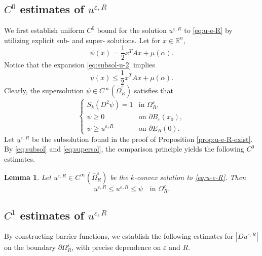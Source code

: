 \documentclass[reqno]{amsart}
\newtheorem{lemma}[theorem]{Lemma}
\theoremstyle{remark}
\theoremstyle{definition}
\numberwithin{equation}{section}
\begin{document}
\subsection{$C^0$ estimates of $u^{\varepsilon,R}$}\label{subsec:C0-est}
We first establish uniform $C^0$ bound for the solution $u^{\varepsilon,R}$ to \eqref{eq:u-e-R} by utilizing explicit sub- and super- solutions. 
Let for $x\in\mathbb{R}^n$,
\begin{equation}\label{eq:psi}
	\psi(x)=\frac{1}{2}x^TAx+\mu(\alpha).
\end{equation}
Notice that the expansion \eqref{eq:subsol-u-2} implies
$$\underline{u}(x)\leq\frac{1}{2}x^TAx+\mu(\alpha).$$
Clearly, the supersolution $\psi\in C^\infty(\bar{\Omega}_R^\varepsilon)$ satisfies that
\begin{equation}\label{eq:supersol}
	\begin{cases}
		S_k(D^2\psi)=1 & \text{in }\Omega_R^\varepsilon, \\
		\psi\geq0 & \text{on }\partial B_\varepsilon(x_0), \\
		\psi\geq u^{\varepsilon,R} & \text{on }\partial E_R(0).
	\end{cases}
\end{equation}
Let $\underline{u}^{\varepsilon,R}$ be the subsolution found in the proof of Proposition \ref{prop:u-e-R-exist}. By \eqref{eq:subsol} and \eqref{eq:supersol}, the comparison principle yields the following $C^0$ estimates.

\begin{lemma}\label{lem:C0-est}
	Let $u^{\varepsilon,R}\in C^\infty(\bar{\Omega}_R^\varepsilon)$ be the $k$-convex solution to \eqref{eq:u-e-R}. Then
	$$\underline{u}^{\varepsilon,R}\leq u^{\varepsilon,R}\leq \psi\quad\text{in }\Omega_R^\varepsilon.$$
\end{lemma}

\subsection{$C^1$ estimates of $u^{\varepsilon,R}$}
By constructing barrier functions, we establish the following estimates for $|Du^{\varepsilon,R}|$ on the boundary $\partial\Omega_R^\varepsilon$, with precise dependence on $\varepsilon$ and $R$.
\end{document}
